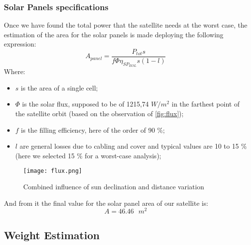 \subsubsection{Solar Panels specifications}
	Once we have found the total power that the satellite needs at the worst case, the estimation of the area for the solar panels is made deploying the following expression:
\begin{equation}
A_{panel} = \frac{P_{tot} s}{f \Phi \eta_{SP_{EOL}} s (1 - l)}
\end{equation}
Where:
\begin{itemize}
\item $s$ is the area of a single cell;
\item $\Phi$ is the solar flux, supposed to be of 1215,74 $W/m^2$ in the farthest point of the satellite orbit (based on the observation of \autoref{fig:flux});
\item $f$ is the filling efficiency, here of the order of 90 \%;
\item $l$ are general losses due to cabling and cover and typical values are 10 to 15 \% (here we selected 15 \% for a worst-case analysis);
\end{itemize}
\begin{figure}[h]
\centering
\texttt{[image: flux.png]}
\caption{Combined influence of sun declination and distance variation}
\label{fig:flux}
\end{figure}
And from it the final value for the solar panel area of our satellite is:
\begin{equation}
A = 46.46 \text{ $m^2$}
\end{equation}
\subsection{Weight Estimation}
\lipsum[1]
